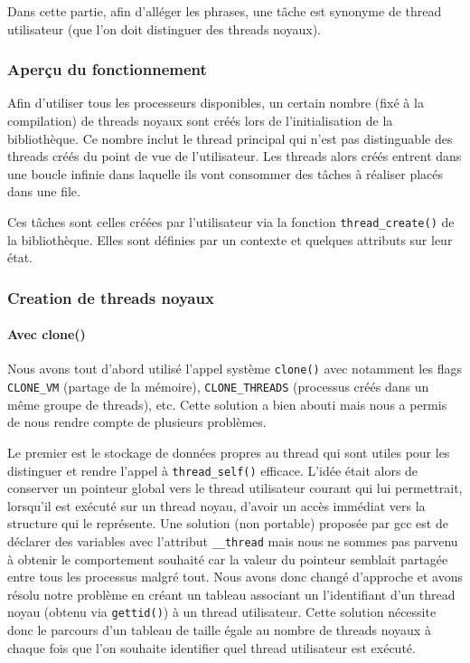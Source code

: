 Dans cette partie, afin d'alléger les phrases, une tâche est synonyme de thread utilisateur (que l'on doit distinguer des threads noyaux).

\subsubsection{Aperçu du fonctionnement}

Afin d'utiliser tous les processeurs disponibles, un certain nombre (fixé à la compilation) de threads noyaux sont créés lors de l'initialisation de la bibliothèque. Ce nombre inclut le thread principal qui n'est pas distinguable des threads créés du point de vue de l'utilisateur. Les threads alors créés entrent dans une boucle infinie dans laquelle ils vont consommer des tâches à réaliser placés dans une file.

Ces tâches sont celles créées par l'utilisateur via la fonction \verb!thread_create()! de la bibliothèque. Elles sont définies par un contexte et quelques attributs sur leur état.


\subsubsection{Creation de threads noyaux}

\paragraph{Avec clone()}
Nous avons tout d'abord utilisé l'appel système \verb!clone()! avec notamment les flags \verb!CLONE_VM! (partage de la mémoire), \verb!CLONE_THREADS! (processus créés dans un même groupe de threads), etc. Cette solution a bien abouti mais nous a permis de nous rendre compte de plusieurs problèmes.

Le premier est le stockage de données propres au thread qui sont utiles pour les distinguer et rendre l'appel à \verb!thread_self()! efficace. L'idée était alors de conserver un pointeur global vers le thread utilisateur courant qui lui permettrait, lorsqu'il est exécuté sur un thread noyau, d'avoir un accès immédiat vers la structure qui le représente. Une solution (non portable) proposée par gcc est de déclarer des variables avec l'attribut \verb!__thread! mais nous ne sommes pas parvenu à obtenir le comportement souhaité car la valeur du pointeur semblait partagée entre tous les processus malgré tout. Nous avons donc changé d'approche et avons résolu notre problème en créant un tableau associant un l'identifiant d'un thread noyau (obtenu via \verb!gettid()!) à un thread utilisateur. Cette solution nécessite donc le parcours d'un tableau de taille égale au nombre de threads noyaux à chaque fois que l'on souhaite identifier quel thread utilisateur est exécuté.

